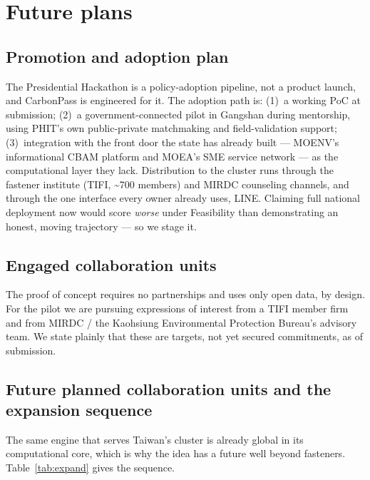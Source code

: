 \documentclass[11pt]{article}
\begin{document}
\section{Future plans}
\subsection{Promotion and adoption plan}
The Presidential Hackathon is a policy-adoption pipeline, not a product launch, and CarbonPass is engineered for it. The adoption path is: (1)~a working PoC at submission; (2)~a government-connected pilot in Gangshan during mentorship, using PHIT's own public-private matchmaking and field-validation support; (3)~integration with the front door the state has already built --- MOENV's informational CBAM platform and MOEA's SME service network --- as the computational layer they lack. Distribution to the cluster runs through the fastener institute (TIFI, \textasciitilde700 members) and MIRDC counseling channels, and through the one interface every owner already uses, LINE. Claiming full national deployment now would score \emph{worse} under Feasibility than demonstrating an honest, moving trajectory --- so we stage it.

\subsection{Engaged collaboration units}
The proof of concept requires no partnerships and uses only open data, by design. For the pilot we are pursuing expressions of interest from a TIFI member firm and from MIRDC / the Kaohsiung Environmental Protection Bureau's advisory team. We state plainly that these are targets, not yet secured commitments, as of submission.

\subsection{Future planned collaboration units and the expansion sequence}
The same engine that serves Taiwan's cluster is already global in its computational core, which is why the idea has a future well beyond fasteners. Table~\ref{tab:expand} gives the sequence.
\end{document}
